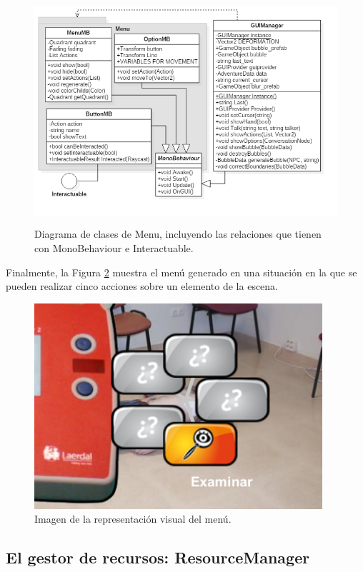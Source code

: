 \begin{figure}[h!]
	\centerline{\includegraphics[height=3.3in]{figures/it2/Menu.png}}
	\caption[Menu - Versión Final]{Diagrama de clases de Menu, incluyendo las relaciones que tienen con MonoBehaviour e Interactuable.}
	\label{menuit2}
\end{figure}

Finalmente, la Figura \ref{menuvisualit2} muestra el menú generado en una situación en la que se pueden realizar cinco acciones sobre un elemento de la escena. 

\begin{figure}[h!]
	\centerline{\includegraphics[height=3in]{figures/it2/apearance/menu.png}}
	\caption[Visual Menu - Versión Final]{Imagen de la representación visual del menú.}
	\label{menuvisualit2}
\end{figure}

\subsection{El gestor de recursos: ResourceManager}
\label{resourcemanager}

